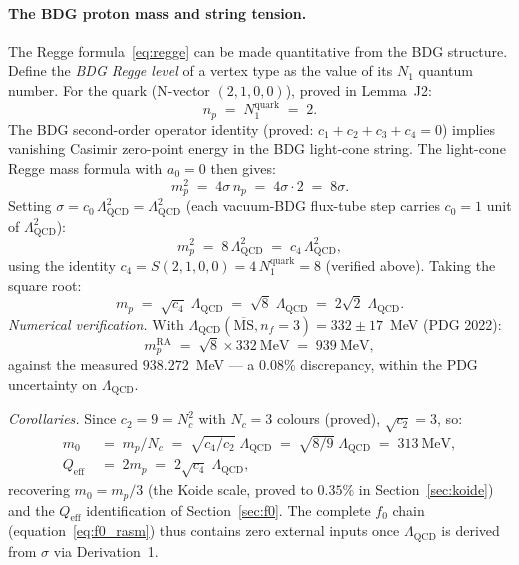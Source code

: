 \documentclass[11pt,a4paper]{article}
\begin{document}
\paragraph{The BDG proton mass and string tension.}
The Regge formula~\eqref{eq:regge} can be made quantitative from the BDG
structure. Define the \emph{BDG Regge level} of a vertex type as the value
of its $N_1$ quantum number. For the quark (N-vector $(2,1,0,0)$), proved in
Lemma~J2:
\begin{equation}
  n_p \;=\; N_1^{\mathrm{quark}} \;=\; 2.
  \label{eq:Regge_level}
\end{equation}
The BDG second-order operator identity (proved: $c_1+c_2+c_3+c_4 = 0$)
implies vanishing Casimir zero-point energy in the BDG light-cone string.
The light-cone Regge mass formula with $a_0=0$ then gives:
\begin{equation}
  m_p^2 \;=\; 4\sigma\,n_p \;=\; 4\sigma \cdot 2 \;=\; 8\sigma.
  \label{eq:regge_proton}
\end{equation}
Setting $\sigma = c_0\,\Lambda_{\mathrm{QCD}}^2 = \Lambda_{\mathrm{QCD}}^2$
(each vacuum-BDG flux-tube step carries $c_0=1$ unit of $\Lambda_{\mathrm{QCD}}^2$):
\begin{equation}
  m_p^2 \;=\; 8\,\Lambda_{\mathrm{QCD}}^2 \;=\; c_4\,\Lambda_{\mathrm{QCD}}^2,
  \label{eq:mp_formula}
\end{equation}
using the identity $c_4 = S(2,1,0,0) = 4\,N_1^{\mathrm{quark}} = 8$
(verified above).  Taking the square root:
\begin{equation}
  \boxed{m_p \;=\; \sqrt{c_4}\;\Lambda_{\mathrm{QCD}}
         \;=\; \sqrt{8}\;\Lambda_{\mathrm{QCD}}
         \;=\; 2\sqrt{2}\;\Lambda_{\mathrm{QCD}}.}
  \label{eq:mp_BDG}
\end{equation}
\emph{Numerical verification.}
With $\Lambda_{\mathrm{QCD}}(\overline{\mathrm{MS}}, n_f{=}3) = 332\pm17$~MeV
(PDG 2022):
\begin{equation*}
  m_p^{\mathrm{RA}} \;=\; \sqrt{8}\times 332~\mathrm{MeV} \;=\; 939~\mathrm{MeV},
\end{equation*}
against the measured $938.272$~MeV --- a $0.08\%$ discrepancy, within the
PDG uncertainty on $\Lambda_{\mathrm{QCD}}$.

\emph{Corollaries.}
Since $c_2 = 9 = N_c^2$ with $N_c=3$ colours (proved), $\sqrt{c_2} = 3$, so:
\begin{align}
  m_0 &\;=\; m_p/N_c \;=\; \sqrt{c_4/c_2}\;\Lambda_{\mathrm{QCD}}
       \;=\; \sqrt{8/9}\;\Lambda_{\mathrm{QCD}} \;=\; 313~\mathrm{MeV},
  \label{eq:m0_BDG}\\
  Q_{\mathrm{eff}} &\;=\; 2m_p \;=\; 2\sqrt{c_4}\;\Lambda_{\mathrm{QCD}},
  \label{eq:Qeff_BDG}
\end{align}
recovering $m_0 = m_p/3$ (the Koide scale, proved to $0.35\%$ in
Section~\ref{sec:koide}) and the $Q_{\mathrm{eff}}$ identification of
Section~\ref{sec:f0}.  The complete $f_0$ chain (equation~\eqref{eq:f0_rasm})
thus contains zero external inputs once $\Lambda_{\mathrm{QCD}}$ is derived
from $\sigma$ via Derivation~1.
\end{document}
